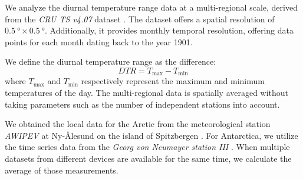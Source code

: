 We analyze the diurnal temperature range data at a multi-regional scale, derived from the \textit{CRU TS v4.07} dataset  \cite{Harris.2020}. The dataset offers a spatial resolution of $\SI{0.5}{\degree} \times \SI{0.5}{\degree}$. Additionally, it provides monthly temporal resolution, offering data points for each month dating back to the year 1901.

We define the diurnal temperature range as the difference: 
\begin{equation}
    DTR = T_{\mathrm{max}} - T_{\mathrm{min}}
\end{equation}
where $T_{\mathrm{max}}$ and $T_{\mathrm{min}}$ respectively represent the maximum and minimum temperatures of the day. The multi-regional data is spatially averaged without taking parameters such as the number of independent stations into account.

We obtained the local data for the Arctic from the meteorological station \textit{AWIPEV} at Ny-Ålesund on the island of Spitzbergen \cite{Maturilli.2020}. For Antarctica, we utilize the time series data from the \textit{Georg von Neumayer station III} \cite{KonigLanglo.2017}. When multiple datasets from different devices are available for the same time, we calculate the average of those measurements.

